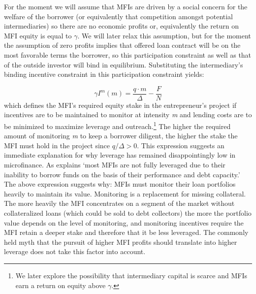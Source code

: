 \documentclass[letterpaper, 12pt]{article}
\begin{document}
For the moment we will assume that MFIs are driven by a social concern
for the welfare of the borrower (or equivalently that competition
amongst potential intermediaries) so there are no economic profits or,
equivalently the return on MFI equity is equal to \(\gamma\). We will
later relax this assumption, but for the moment the assumption of zero
profits implies that offered loan contract will be on the most favorable
terms the borrower, so this participation constraint as well as that of
the outside investor will bind in equilibrium. Substituting the
intermediary's binding incentive constraint in this participation
constraint yields:

\begin{equation}\label{IM}
  \gamma I^{m}(m) = \frac{q \cdot m}{\Delta} - \frac{F}{N}
\end{equation}
which defines the MFI's required equity stake in the entrepreneur's project if incentives are to be maintained to monitor at intensity \emph{m} and lending costs are to be minimized to maximize leverage and outreach.\footnote{We later explore the possibility that intermediary   capital is scarce and MFIs earn a return on equity above $\gamma$.} The
higher the required amount of monitoring \emph{m} to keep a borrower
diligent, the higher the stake the MFI must hold in the project since
$q/\Delta>0$. This expression suggests an immediate
explanation for why leverage has remained disappointingly low in
microfinance. As \citet[][41]{ledgerwood2006} explains `most MFIs are not fully leveraged due to their inability to borrow funds on the basis of their performance and debt capacity.' The above expression suggests why: MFIs must monitor their loan portfolios heavily to maintain its value. Monitoring is a replacement for missing collateral. The more heavily the
MFI concentrates on a segment of the market without collateralized loans
(which could be sold to debt collectors) the more the portfolio value
depends on the level of monitoring, and monitoring incentives require
the MFI retain a deeper stake and therefore that it be less leveraged.
The commonly held myth that the pursuit of higher MFI profits should
translate into higher leverage does not take this factor into account.
\end{document}
